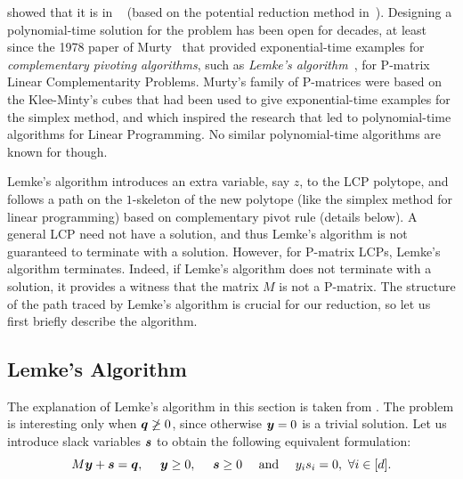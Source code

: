 showed that it is in \CLS~\cite{daskalakis2011continuous} (based on the
potential reduction method in~\cite{kojima1992interior}).  Designing a
polynomial-time solution for the \PLCP problem has been open for decades, at
least since the 1978 paper of Murty~\cite{murty1978computational} that provided
exponential-time examples for \emph{complementary pivoting algorithms}, such as 
\emph{Lemke's algorithm}~\cite{lemke1965bimatrix}, for
P-matrix Linear Complementarity Problems. Murty's family of P-matrices were
based on the Klee-Minty's cubes that had been used to give exponential-time
examples for the simplex method, and which inspired the research that led to
polynomial-time algorithms for Linear Programming. No similar polynomial-time
algorithms are known for \PLCP though.

Lemke's algorithm introduces an extra variable, say $z$, to the LCP polytope,
and follows a path on the $1$-skeleton of the new polytope (like the simplex 
method for linear programming) based
on complementary pivot rule (details below).  A general LCP need not have a
solution, and thus Lemke's algorithm is not guaranteed to terminate with a
solution.  However, for P-matrix LCPs, Lemke's algorithm terminates.  Indeed, if
Lemke's algorithm does not terminate with a solution, it provides a witness that
the matrix $M$ is not a P-matrix.  The structure of the path traced by Lemke's
algorithm is crucial for our reduction, so let us first briefly describe the
algorithm.

\subsection{Lemke's Algorithm}
\label{sec:lemke}

The explanation of Lemke's algorithm in this section is taken from \cite{GMSV}.
The problem is interesting only when $\mbox{\boldmath $q$} \not \geq 0$, since otherwise $\mbox{\boldmath $y$} = 0$ is a trivial solution. Let us introduce
slack variables $\mbox{\boldmath $s$}$ to obtain the following equivalent formulation:
\begin{equation} \label{eq:b} \MM \yy  + \ps = \pq, \ \ \ \  \yy \geq 0, \ \ \ \ \ps \geq 0 \ \ \ \ \mbox{and} \ \ \ \ y_is_i = 0,\ \forall i\in[d].  \end{equation}

